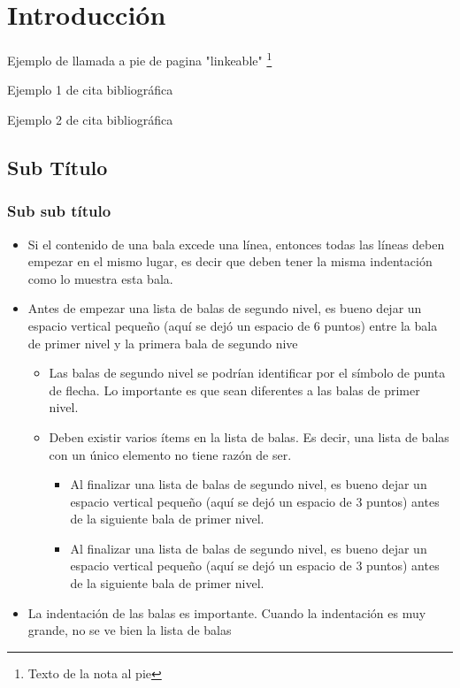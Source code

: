 \section{Introducción}

Ejemplo de llamada a pie de pagina "linkeable" \footnote{Texto de la nota al pie}\par
Ejemplo 1 de cita bibliográfica \cite{tapscott2016blockchain}\par
Ejemplo 2 de cita bibliográfica\cite[pág 21]{tapscott2016blockchain}\par
\lipsum[1-2]

\subsection{Sub Título}
   \lipsum[1-2]

\subsubsection{Sub sub título}
   \lipsum[1]
   \begin{itemize}
      \item Si el contenido de una bala excede una línea, entonces todas las líneas deben empezar
            en el mismo lugar, es decir que deben tener la misma indentación como lo muestra esta
            bala.
      \item Antes de empezar una lista de balas de segundo nivel, es bueno dejar un espacio vertical
            pequeño (aquí se dejó un espacio de 6 puntos) entre la bala de primer nivel y la primera
            bala de segundo nive
      \begin{itemize}
         \item Las balas de segundo nivel se podrían identificar por el símbolo de punta de flecha.
               Lo importante es que sean diferentes a las balas de primer nivel.
         \item Deben existir varios ítems en la lista de balas. Es decir, una lista de balas con un
               único elemento no tiene razón de ser.
         \begin{itemize}
            \item Al finalizar una lista de balas de segundo nivel, es bueno dejar un espacio vertical
                  pequeño (aquí se dejó un espacio de 3 puntos) antes de la siguiente bala de primer nivel.
            \item Al finalizar una lista de balas de segundo nivel, es bueno dejar un espacio vertical
                  pequeño (aquí se dejó un espacio de 3 puntos) antes de la siguiente bala de primer nivel.
         \end{itemize}
      \end{itemize}
      \item La indentación de las balas es importante. Cuando la indentación es muy grande, no se
            ve bien la lista de balas
   \end{itemize}
   \lipsum[1-2]

